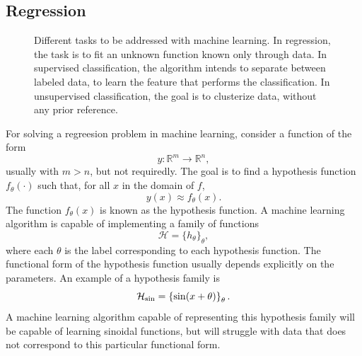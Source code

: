 \documentclass[]{report}
\begin{document}
\subsection{Regression}\label{sec.regression}

\begin{figure}



\caption{Different tasks to be addressed with machine learning. In regression, the task is to fit an unknown function known only through data. In supervised classification, the algorithm intends to separate between labeled data, to learn the feature that performs the classification. In unsupervised classification, the goal is to clusterize data, without any prior reference.}
\end{figure}


For solving a regreesion problem in machine learning, consider a function of the form 
\begin{equation}
y: \mathbb{R}^m \rightarrow \mathbb R^n, 
\end{equation}
usually with $m > n$, but not requiredly. The goal is to find a hypothesis function $f_\theta(\cdot)$ such that, for all $x$ in the domain of $f$, 
\begin{equation}
y(x) \approx f_\theta(x).
\end{equation}
The function $f_\theta(x)$ is known as the hypothesis function. A machine learning algorithm is capable of implementing a family of functions 
\begin{equation}
\mathcal H = \{ h_\theta\}_\theta, 
\end{equation}
where each $\theta$ is the label corresponding to each hypothesis function. The functional form of the hypothesis function usually depends explicitly on the parameters. An example of a hypothesis family is
\begin{equation}
\mathcal H_{\rm sin} = \left\{ \sin(x + \theta)\right\}_\theta.
\end{equation}
A machine learning algorithm capable of representing this hypothesis family will be capable of learning sinoidal functions, but will struggle with data that does not correspond to this particular functional form. 
\end{document}
